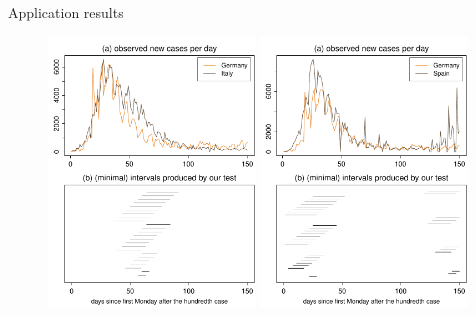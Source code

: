 \documentclass[10pt, handout]{beamer}
\begin{document}
\begin{frame}{Application results}
	\begin{figure}
		\includegraphics[width=0.49\textwidth]{plots/DEU_vs_ITA_presentation}
		\hfill
		\includegraphics[width=0.49\textwidth]{plots/DEU_vs_ESP_presentation}
	\end{figure}
\end{frame}
\end{document}
